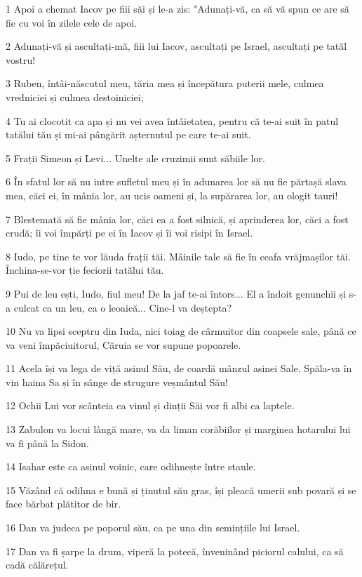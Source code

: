 \par 1 Apoi a chemat Iacov pe fiii săi și le-a zis: "Adunați-vă, ca să vă spun ce are să fie cu voi în zilele cele de apoi.
\par 2 Adunați-vă și ascultați-mă, fiii lui Iacov, ascultați pe Israel, ascultați pe tatăl vostru!
\par 3 Ruben, întâi-născutul meu, tăria mea și începătura puterii mele, culmea vredniciei și culmea destoiniciei;
\par 4 Tu ai clocotit ca apa și nu vei avea întâietatea, pentru că te-ai suit în patul tatălui tău și mi-ai pângărit așternutul pe care te-ai suit.
\par 5 Frații Simeon și Levi... Unelte ale cruzimii sunt săbiile lor.
\par 6 În sfatul lor să nu intre sufletul meu și în adunarea lor să nu fie părtașă slava mea, căci ei, în mânia lor, au ucis oameni și, la supărarea lor, au ologit tauri!
\par 7 Blestemată să fie mânia lor, căci ea a fost silnică, și aprinderea lor, căci a fost crudă; îi voi împărți pe ei în Iacov și îi voi risipi în Israel.
\par 8 Iudo, pe tine te vor lăuda frații tăi. Mâinile tale să fie în ceafa vrăjmașilor tăi. Închina-se-vor ție feciorii tatălui tău.
\par 9 Pui de leu ești, Iudo, fiul meu! De la jaf te-ai întors... El a îndoit genunchii și s-a culcat ca un leu, ca o leoaică... Cine-l va deștepta?
\par 10 Nu va lipsi sceptru din Iuda, nici toiag de cârmuitor din coapsele sale, până ce va veni împăciuitorul, Căruia se vor supune popoarele.
\par 11 Acela își va lega de viță asinul Său, de coardă mânzul asinei Sale. Spăla-va în vin haina Sa și în sânge de strugure veșmântul Său!
\par 12 Ochii Lui vor scânteia ca vinul și dinții Săi vor fi albi ca laptele.
\par 13 Zabulon va locui lângă mare, va da liman corăbiilor și marginea hotarului lui va fi până la Sidon.
\par 14 Isahar este ca asinul voinic, care odihnește între staule.
\par 15 Văzând că odihna e bună și ținutul său gras, își pleacă umerii sub povară și se face bărbat plătitor de bir.
\par 16 Dan va judeca pe poporul său, ca pe una din semințiile lui Israel.
\par 17 Dan va fi șarpe la drum, viperă la potecă, înveninând piciorul calului, ca să cadă călărețul.
